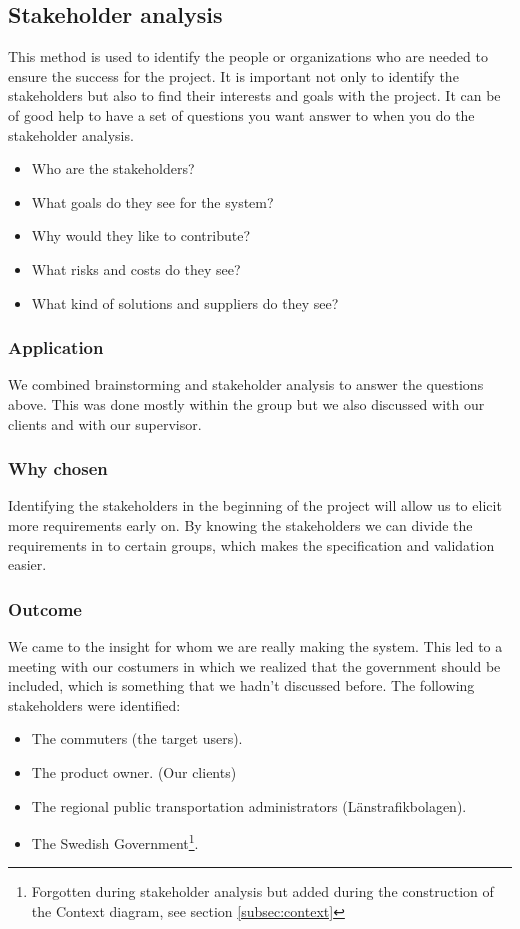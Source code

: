 \documentclass[a4paper]{article}
\begin{document}
    \subsection{Stakeholder analysis}
 This method is used to identify the people or organizations who are needed
to ensure the success for the project. It is important not only to identify the
stakeholders but also to find their interests and goals with the project. It can
be of good help to have a set of questions you want answer to when you do the
stakeholder analysis.

    \begin{itemize}
      \item Who are the stakeholders?
      \item What goals do they see for the system?
      \item Why would they like to contribute?
      \item What risks and costs do they see?
      \item What kind of solutions and suppliers do they see?
    \end{itemize}
    
    \subsubsection{Application}
 We combined brainstorming and stakeholder analysis to answer the questions
above. This was done mostly within the group but we also discussed with our
clients and with our supervisor.
    \subsubsection{Why chosen}
    Identifying the stakeholders in the beginning of the project will allow us to elicit
more requirements early on. By knowing the stakeholders we can divide the
requirements in to certain groups, which makes the specification and validation
easier.
    \subsubsection{Outcome}
We came to the insight for whom we are really making the system. This led to
a meeting with our costumers in which we realized that the government should
be included, which is something that we hadn’t discussed before.
	The following stakeholders were identified:

    \begin{itemize}
      \item The commuters (the target users).
      \item The product owner. (Our clients)
      \item The regional public transportation administrators (Länstrafikbolagen). 
      \item The Swedish Government\footnote{Forgotten during stakeholder analysis but added during the construction of the Context diagram, see section \ref{subsec:context}}.
    \end{itemize}
    
\end{document}
